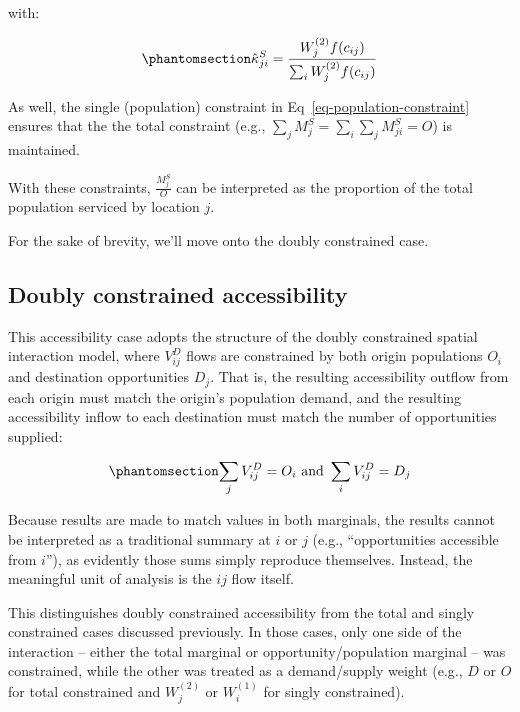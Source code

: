 \documentclass[
  10pt,
  letterpaper,
]{article}
\begin{document}
\noindent with:

\begin{equation}\phantomsection\label{eq-attraction-constrained-proportional-allocation-factor}{
\hat \kappa^S_{ji} = \frac{W_j^{(2)} f(c_{ij})}{\sum_i W_j^{(2)} f(c_{ij})}
}\end{equation}

As well, the single (population) constraint in
Eq~\ref{eq-population-constraint} ensures that the the total constraint
(e.g., \(\sum_j M^S_{j} = \sum_i\sum_j  M^S_{ji} = O\)) is maintained.

With these constraints, \(\frac{M_j^S}{O}\) can be interpreted as the
proportion of the total population serviced by location \(j\).

For the sake of brevity, we'll move onto the doubly constrained case.

\subsection{Doubly constrained
accessibility}\label{doubly-constrained-accessibility}

This accessibility case adopts the structure of the doubly constrained
spatial interaction model, where \(V_{ij}^D\) flows are constrained by
both origin populations \(O_i\) and destination opportunities \(D_j\).
That is, the resulting accessibility outflow from each origin must match
the origin's population demand, and the resulting accessibility inflow
to each destination must match the number of opportunities supplied:

\begin{equation}\phantomsection\label{eq-opportunity-population-equality-1}{
\sum_j V_{ij}^D = O_i \text{ and }  \sum_i V_{ij}^D =  D_j
}\end{equation}

Because results are made to match values in both marginals, the results
cannot be interpreted as a traditional summary at \(i\) or \(j\) (e.g.,
``opportunities accessible from \(i\)''), as evidently those sums simply
reproduce themselves. Instead, the meaningful unit of analysis is the
\(ij\) flow itself.

This distinguishes doubly constrained accessibility from the total and
singly constrained cases discussed previously. In those cases, only one
side of the interaction -- either the total marginal or
opportunity/population marginal -- was constrained, while the other was
treated as a demand/supply weight (e.g., \(D\) or \(O\) for total
constrained and \(W_j^{(2)}\) or \(W_i^{(1)}\) for singly constrained).
\end{document}
